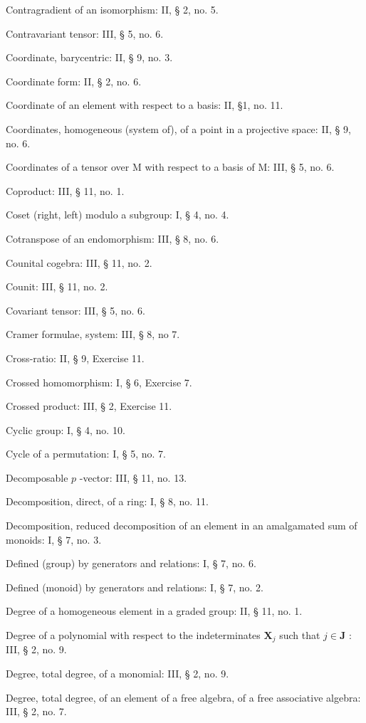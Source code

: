 Contragradient of an isomorphism: II, § 2, no. 5.

Contravariant tensor: III, § 5, no. 6.

Coordinate, barycentric: II, § 9, no. 3.

Coordinate form: II, § 2, no. 6.

Coordinate of an element with respect to a basis: II, §1, no. 11.

Coordinates, homogeneous (system of), of a point in a projective space: II, § 9, no. 6.

Coordinates of a tensor over M with respect to a basis of M: III, § 5, no. 6.

Coproduct: III, § 11, no. 1.

Coset (right, left) modulo a subgroup: I, § 4, no. 4.

Cotranspose of an endomorphism: III, § 8, no. 6.

Counital cogebra: III, § 11, no. 2.

Counit: III, § 11, no. 2.

Covariant tensor: III, § 5, no. 6.

Cramer formulae, system: III, § 8, no 7.

Cross-ratio: II, § 9, Exercise 11.

Crossed homomorphism: I, § 6, Exercise 7.

Crossed product: III, § 2, Exercise 11.

Cyclic group: I, § 4, no. 10.

Cycle of a permutation: I, § 5, no. 7.

Decomposable \(p\) -vector: III, § 11, no. 13.

Decomposition, direct, of a ring: I, § 8, no. 11.

Decomposition, reduced decomposition of an element in an amalgamated sum of monoids: I, § 7, no. 3.

Defined (group) by generators and relations: I, § 7, no. 6.

Defined (monoid) by generators and relations: I, § 7, no. 2.

Degree of a homogeneous element in a graded group: II, § 11, no. 1.

Degree of a polynomial with respect to the indeterminates \(\mathbf{X}_j\) such that \(j\in \mathbf{J}\) : III, § 2, no. 9.

Degree, total degree, of a monomial: III, § 2, no. 9.

Degree, total degree, of an element of a free algebra, of a free associative algebra: III, § 2, no. 7.

